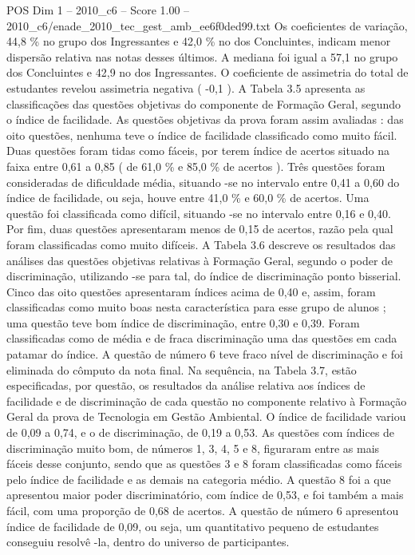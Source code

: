 \begin{textsample}{POS Dim 1 – 2010\_c6 – Score 1.00 – 2010\_c6/enade\_2010\_tec\_gest\_amb\_ee6f0ded99.txt}
Os coeficientes de variação, 44,8 \% no grupo dos Ingressantes e 42,0 \% no dos Concluintes, indicam menor dispersão relativa nas notas desses últimos.
A mediana foi igual a 57,1 no grupo dos Concluintes e 42,9 no dos Ingressantes.
O coeficiente de assimetria do total de estudantes revelou assimetria negativa ( -0,1 ).
A Tabela 3.5 apresenta as classificações das questões objetivas do componente de Formação Geral, segundo o índice de facilidade.
As questões objetivas da prova foram assim avaliadas : das oito questões, nenhuma teve o índice de facilidade classificado como muito fácil.
Duas questões foram tidas como fáceis, por terem índice de acertos situado na faixa entre 0,61 a 0,85 ( de 61,0 \% e 85,0 \% de acertos ).
Três questões foram consideradas de dificuldade média, situando -se no intervalo entre 0,41 a 0,60 do índice de facilidade, ou seja, houve entre 41,0 \% e 60,0 \% de acertos.
Uma questão foi classificada como difícil, situando -se no intervalo entre 0,16 e 0,40.
Por fim, duas questões apresentaram menos de 0,15 de acertos, razão pela qual foram classificadas como muito difíceis.
A Tabela 3.6 descreve os resultados das análises das questões objetivas relativas à Formação Geral, segundo o poder de discriminação, utilizando -se para tal, do índice de discriminação ponto bisserial.
Cinco das oito questões apresentaram índices acima de 0,40 e, assim, foram classificadas como muito boas nesta característica para esse grupo de alunos ; uma questão teve bom índice de discriminação, entre 0,30 e 0,39.
Foram classificadas como de média e de fraca discriminação uma das questões em cada patamar do índice.
A questão de número 6 teve fraco nível de discriminação e foi eliminada do cômputo da nota final.
Na sequência, na Tabela 3.7, estão especificadas, por questão, os resultados da análise relativa aos índices de facilidade e de discriminação de cada questão no componente relativo à Formação Geral da prova de Tecnologia em Gestão Ambiental.
O índice de facilidade variou de 0,09 a 0,74, e o de discriminação, de 0,19 a 0,53.
As questões com índices de discriminação muito bom, de números 1, 3, 4, 5 e 8, figuraram entre as mais fáceis desse conjunto, sendo que as questões 3 e 8 foram classificadas como fáceis pelo índice de facilidade e as demais na categoria médio.
A questão 8 foi a que apresentou maior poder discriminatório, com índice de 0,53, e foi também a mais fácil, com uma proporção de 0,68 de acertos.
A questão de número 6 apresentou índice de facilidade de 0,09, ou seja, um quantitativo pequeno de estudantes conseguiu resolvê -la, dentro do universo de participantes.

\end{textsample}
